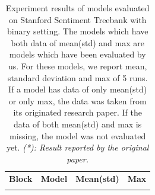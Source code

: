 \begin{table}[H]
    \centering
    \caption[Experiment result on SST]{Experiment results of models evaluated on Stanford Sentiment Treebank with binary setting.
The models which have both data of mean(std) and max are models which have been evaluated by us.
For these models, we report mean, standard deviation and max of 5 runs.
If a model has data of only mean(std) or only max, the data was taken from its originated research paper.
If the data of both mean(std) and max is missing, the model was not evaluated yet.
\textit{(*): Result reported by the original paper.}}
    \label{table:experimentresult}
    \begin{tabular}{c|lll}
    \textbf{Block}    & \textbf{Model}  & \textbf{Mean(std)} & \textbf{Max}   \\
\Xhline{3\arrayrulewidth}
\Xhline{3\arrayrulewidth}


\end{tabular}
\end{table}
